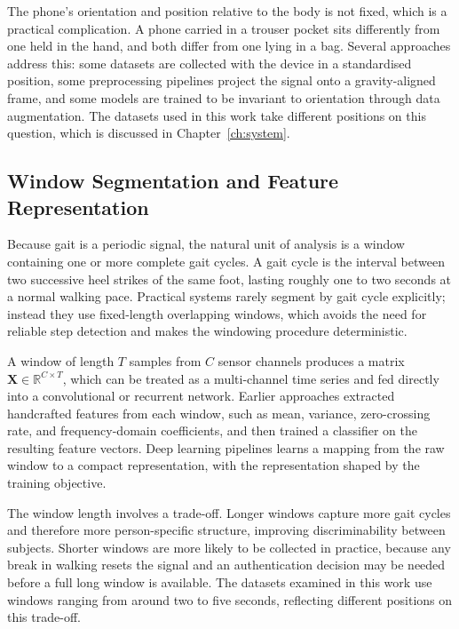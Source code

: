 The phone's orientation and position relative to the body is not fixed, which is a practical complication. A phone carried in a trouser pocket sits differently from one held in the hand, and both differ from one lying in a bag. Several approaches address this: some datasets are collected with the device in a standardised position, some preprocessing pipelines project the signal onto a gravity-aligned frame, and some models are trained to be invariant to orientation through data augmentation. The datasets used in this work take different positions on this question, which is discussed in Chapter~\ref{ch:system}.

\subsection{Window Segmentation and Feature Representation}
\label{ssec:bg_windows}

Because gait is a periodic signal, the natural unit of analysis is a window containing one or more complete gait cycles. A gait cycle is the interval between two successive heel strikes of the same foot, lasting roughly one to two seconds at a normal walking pace. Practical systems rarely segment by gait cycle explicitly; instead they use fixed-length overlapping windows, which avoids the need for reliable step detection and makes the windowing procedure deterministic.

A window of length $T$ samples from $C$ sensor channels produces a matrix $\mathbf{X} \in \mathbb{R}^{C \times T}$, which can be treated as a multi-channel time series and fed directly into a convolutional or recurrent network. Earlier approaches extracted handcrafted features from each window, such as mean, variance, zero-crossing rate, and frequency-domain coefficients, and then trained a classifier on the resulting feature vectors. Deep learning pipelines learns a mapping from the raw window to a compact representation, with the representation shaped by the training objective.

The window length involves a trade-off. Longer windows capture more gait cycles and therefore more person-specific structure, improving discriminability between subjects. Shorter windows are more likely to be collected in practice, because any break in walking resets the signal and an authentication decision may be needed before a full long window is available. The datasets examined in this work use windows ranging from around two to five seconds, reflecting different positions on this trade-off.

